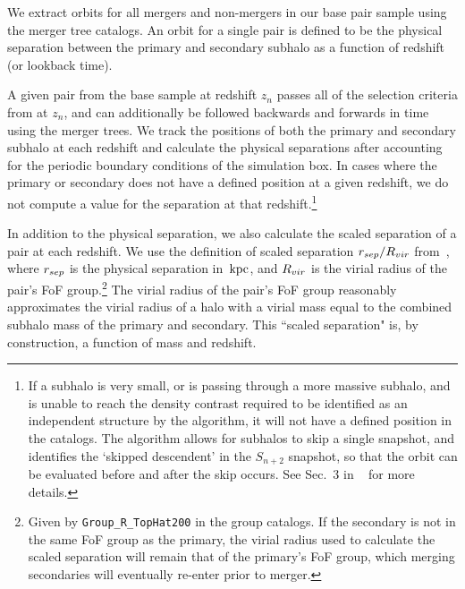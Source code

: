 \documentclass[twocolumn,linenumbers]{aastex631}
\newcommand{\chambe}{\citet{Chamberlain2024}}
\begin{document}
We extract orbits for all mergers and non-mergers in our base pair sample using the merger tree catalogs. 
An orbit for a single pair is defined to be the physical separation between the primary and secondary subhalo as a function of redshift (or lookback time).

A given pair from the base sample at redshift $z_n$ passes all of the selection criteria from \chambe{} at $z_n$, and can additionally be followed backwards and forwards in time using the \sublink{} merger trees. 
We track the positions of both the primary and secondary subhalo at each redshift and calculate the physical separations after accounting for the periodic boundary conditions of the simulation box.
In cases where the primary or secondary does not have a defined position at a given redshift, we do not compute a value for the separation at that redshift.\footnote{If a subhalo is very small, or is passing through a more massive subhalo, and is unable to reach the density contrast required to be identified as an independent structure by the \subfind{} algorithm, it will not have a defined position in the \sublink{} catalogs. The \sublink{} algorithm allows for subhalos to skip a single snapshot, and identifies the `skipped descendent' in the $S_{n+2}$ snapshot, so that the orbit can be evaluated before and after the skip occurs. See Sec.~3 in ~\citet{RG2015} for more details.}

In addition to the physical separation, we also calculate the scaled separation of a pair at each redshift. We use the definition of scaled separation $r_{sep}/R_{vir}$ from~\cite{Chamberlain2024}, where $r_{sep}$ is the physical separation in $\mathrm{\,kpc}$, and $R_{vir}$ is the virial radius of the pair's FoF group.\footnote{Given by \texttt{Group\_R\_TopHat200} in the group catalogs. If the secondary is not in the same FoF group as the primary, the virial radius used to calculate the scaled separation will remain that of the primary's FoF group, which merging secondaries will eventually re-enter prior to merger.} 
The virial radius of the pair's FoF group reasonably approximates the virial radius of a halo with a virial mass equal to the combined subhalo mass of the primary and secondary.
This ``scaled separation" is, by construction, a function of mass and redshift.

\end{document}
